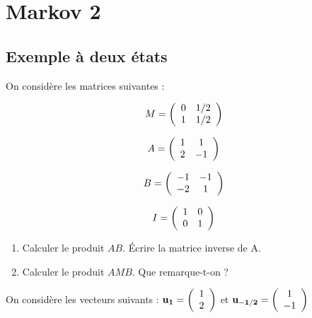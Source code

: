 \newpage
\section{Markov 2}
%
\Large
\subsection{Exemple à deux états}
On considère les matrices suivantes :

\begin{minipage}[c]{.2\linewidth}
\[ M = \left( \begin{array}{ c c } 0 & 1/2 \\ 1 & 1/2 \end{array} \right) \]
\end{minipage}
\hfill
\begin{minipage}[c]{.2\linewidth}
\[ A = \left( \begin{array}{ c c } 1 & 1 \\ 2 & -1 \end{array} \right) \]
\end{minipage}
\hfill
\begin{minipage}[c]{.2\linewidth}
\[ B = \left( \begin{array}{ c c } -1 & -1 \\ -2 & 1 \end{array} \right) \]
\end{minipage}
\hfill
\begin{minipage}[c]{.2\linewidth}
\[ I = \left( \begin{array}{ c c } 1 & 0 \\ 0 & 1 \end{array} \right) \]
\end{minipage}

\begin{enumerate}
  \item Calculer le produit $AB$. Écrire la matrice inverse de A.
  \item Calculer le produit $AMB$. Que remarque-t-on ?
\setcounter{numero}{\theenumi}\end{enumerate}

On considère les vecteurs suivants : \hspace{0.5cm}
$ {\bf u_1} = \left( \begin{array}{ c } 1  \\ 2 \end{array} \right) $
\hspace{0.5cm}et\hspace{0.5cm}
$ {\bf u_{-1/2}} = \left( \begin{array}{ c } 1 \\ -1 \end{array} \right) $

